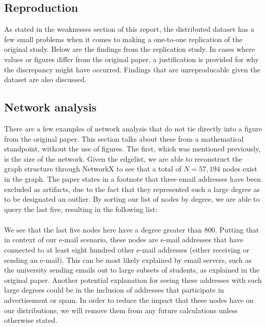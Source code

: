 \documentclass[11pt]{article}
\begin{document}
\begin{multicols}{2}
\section{Reproduction}
\hspace*{\parindent}As stated in the weaknesses section of this report, the distributed dataset has a few small problems when it comes to making a one-to-one replication of the original study. Below are the findings from the replication study. In cases where values or figures differ from the original paper, a justification is provided for why the discrepancy might have occurred. Findings that are unreproducable given the dataset are also discussed. 

\subsection{Network analysis}
\hspace*{\parindent}There are a few examples of network analysis that do not tie directly into a figure from the original paper. This section talks about these from a mathematical standpoint, without the use of figures. The first, which was mentioned previously, is the size of the network. Given the edgelist, we are able to reconstruct the graph structure through NetworkX to see that a total of \(N = 57,194\) nodes exist in the graph. The paper states in a footnote that three email addresses have been excluded as artifacts, due to the fact that they represented such a large degree as to be designated an outlier. By sorting our list of nodes by degree, we are able to query the last five, resulting in the following list:
\begin{align*}
[('13498', 802), ('11798', 1020), ('13678', 1228), \\('11028', 4171), ('32199', 6553)]
\end{align*}

We see that the last five nodes here have a degree greater than \(800\). Putting that in context of our e-mail scenario, these nodes are e-mail addresses that have connected to at least eight hundred other e-mail addresses (either receiving or sending an e-mail). This can be most likely explained by email servers, such as the university sending emails out to large subsets of students, as explained in the original paper. Another potential explanation for seeing these addresses with such large degrees could be in the inclusion of addresses that participate in advertisement or spam. In order to reduce the impact that these nodes have on our distributions, we will remove them from any future calculations unless otherwise stated.


\end{multicols}
\end{document}
